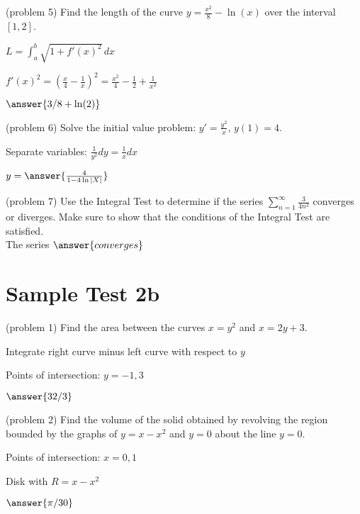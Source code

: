 \documentclass[handout]{ximera}
\begin{document}
\begin{problem}(problem 5)
Find the length of the curve $\displaystyle y = \frac{x^2}{8} - \ln(x)$ over the interval $[1, 2]$.\\
\begin{hint}
$L = \int_a^b \sqrt{1 + f'(x)^2} \, dx$
\end{hint}
\begin{hint}
$\displaystyle f'(x)^2 =\left(\frac{x}{4} - \frac{1}{x}\right)^2 
= \frac{x^2}{4} - \frac{1}{2} + \frac{1}{x^2}$
\end{hint}
$\answer{3/8 + \ln(2)}$
\end{problem}


\begin{problem}(problem 6)
Solve the initial value problem: $\displaystyle y' = \frac{y^2}{x},\, y(1) = 4$.\\
\begin{hint}
Separate variables: $\frac{1}{y^2} dy = \frac{1}{x} dx$
\end{hint}
$y = \answer{\frac{4}{1- 4\ln|X|}}$
\end{problem}


\begin{problem}(problem 7)
Use the Integral Test to determine if the series $\displaystyle \sum_{n=1}^\infty \frac{3}{4n^3}$
converges or diverges. Make sure to show that the
conditions of the Integral Test are satisfied.\\
The series $\answer{converges}$
\end{problem}

\section{Sample Test 2b}

\begin{problem}(problem 1)
Find the area between the curves $x = y^2$ and $x = 2y + 3$.\\
\begin{hint}
Integrate right curve minus left curve with respect to $y$
\end{hint}
\begin{hint}
Points of intersection: $y = -1, 3$
\end{hint}
$\answer{32/3}$
\end{problem}


\begin{problem}(problem 2)
Find the volume of the solid obtained by revolving the region bounded by the 
graphs of $y = x-x^2$ and $y = 0$ about the line $ y = 0$.\\
\begin{hint}
Points of intersection: $x = 0, 1$
\end{hint}
\begin{hint}
Disk with $R = x - x^2$
\end{hint}

$\answer{\pi/30}$
\end{problem}
\end{document}
